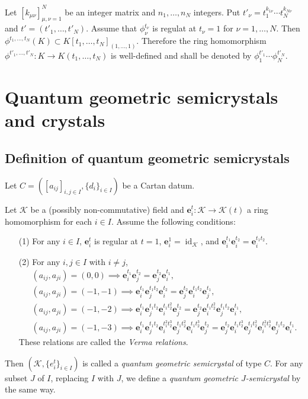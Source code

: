 \documentclass[12pt,a4paper]{article}
\newcommand\id{\mathop{\mathrm{id}}\nolimits}
\newcommand\K{{\mathcal K}}
\newcommand\e{{\mathbf e}}
\theoremstyle{plain} %
\theoremstyle{definition} %
\theoremstyle{definition} %
\numberwithin{theorem}{section}
\numberwithin{equation}{section}
\numberwithin{figure}{section}
\numberwithin{table}{section}
\begin{document}
Let $[k_{\mu\nu}]_{\mu,\nu=1}^N$ be an integer matrix 
and $n_1,\ldots,n_N$ integers.
Put $t'_\nu=t_1^{k_{1\nu}}\cdots t_N^{k_{N\nu}}$ and
$t'=(t'_1,\ldots,t'_N)$.
Assume that $\phi_\nu^{t_\nu}$ is regulat at $t_\nu=1$ for $\nu=1,\ldots,N$.
Then $\phi^{t_1,\ldots,t_N}(K)\subset K[t_1,\ldots,t_N]_{(1,\ldots,1)}$.
Therefore the ring homomorphism $\phi^{t'_1,\ldots,t'_N}:K\to K(t_1,\ldots,t_N)$
is well-defined and shall be denoted by $\phi_1^{t'_1}\cdots\phi_N^{t'_N}$.

\section{Quantum geometric semicrystals and crystals}

\subsection{Definition of quantum geometric semicrystals}

Let $C=([a_{ij}]_{i,j\in I}, \{d_i\}_{i\in I})$ be a Cartan datum.

Let $\K$ be a (possibly non-commutative) field 
and $\e_i^t:\K\to\K(t)$ a ring homomorphism for each $i\in I$.
Assume the following conditions:
\begin{enumerate}
 \item[(1)] For any $i\in I$, $\e_i^t$ is regular at $t=1$,  
  $\e_i^1=\id_\K$, and $\e_i^{t_1}\e_i^{t_2}=\e_i^{t_1t_2}$.
 \item[(2)] For any $i,j\in I$ with $i\ne j$, 
 \begin{align*}
   &
   (a_{ij},a_{ji})=(0,0) \implies
   \e_i^{t_1}\e_j^{t_2} = \e_j^{t_2}\e_i^{t_1},
   \\ &
   (a_{ij},a_{ji})=(-1,-1) \implies
   \e_i^{t_1}\e_j^{t_1t_2}\e_i^{t_2} = \e_j^{t_2}\e_i^{t_1t_2}\e_j^{t_1},
   \\ &
   (a_{ij},a_{ji})=(-1,-2) \implies
   \e_i^{t_1}\e_j^{t_1t_2}\e_i^{t_1t_2^2}\e_j^{t_2}=
   \e_j^{t_2}\e_i^{t_1t_2^2}\e_j^{t_1t_2}\e_i^{t_1},
   \\ &
   (a_{ij},a_{ji})=(-1,-3) \implies
   \e_i^{t_1}\e_j^{t_1t_2}\e_i^{t_1^2t_2^3}\e_j^{t_1t_2^2}\e_i^{t_1t_2^3}\e_j^{t_2}=
   \e_j^{t_2}\e_i^{t_1t_2^3}\e_j^{t_1t_2^2}\e_i^{t_1^2t_2^3}\e_j^{t_1t_2}\e_i^{t_1}.
 \end{align*}
 These relations are called the {\em Verma relations}.
\end{enumerate}
Then $(\K,\{e_i^t\}_{i\in I})$ is called a {\em quantum geometric semicrystal}
of type $C$.
For any subset $J$ of $I$, replacing $I$ with $J$,
we define a {\em quantum geometric $J$-semicrystal} by the same way.
\end{document}
